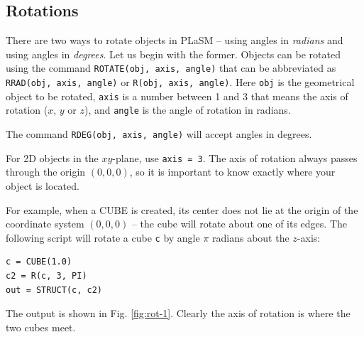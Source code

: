 \noindent

\subsection{Rotations}

There are two ways to rotate objects in PLaSM -- using angles in 
{\em radians} and using angles in {\em degrees}. Let us begin with the former.
Objects can be rotated using the command {\tt ROTATE(obj, axis, angle)} 
that can be abbreviated as {\tt RRAD(obj, axis, angle)} or {\tt R(obj, axis, angle)}. 
Here {\tt obj} is the geometrical object to be rotated, {\tt axis} is a number between 
1 and 3 that means the axis of rotation ($x$, $y$ or $z$), and {\tt angle} is the 
angle of rotation in radians. 

The command {\tt RDEG(obj, axis, angle)} will accept 
angles in degrees.

For 2D objects in the $xy$-plane, use {\tt axis = 3}. The axis of rotation 
always passes through the origin $(0, 0, 0)$, so it is important 
to know exactly where your object is located. 

For example, when a CUBE is created, its center does not lie
at the origin of the coordinate system $(0, 0, 0)$ -- the cube will 
rotate about one of its edges. The following script will rotate 
a cube {\tt c} by angle $\pi$ radians about the $z$-axis: \\

\begin{bbox}
\begin{verbatim}
c = CUBE(1.0)
c2 = R(c, 3, PI)
out = STRUCT(c, c2)
\end{verbatim}
\end{bbox}
\vspace{6mm}

\noindent
The output is shown in Fig. \ref{fig:rot-1}. Clearly the axis of 
rotation is where the two cubes meet.

